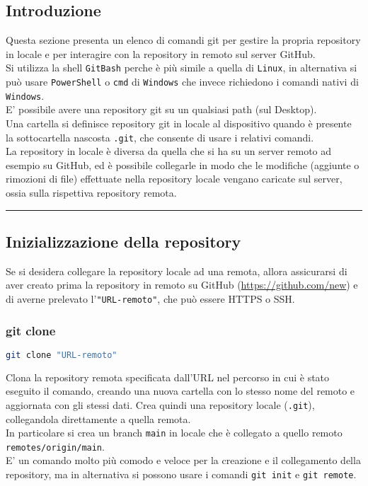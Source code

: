 \subsection*{Introduzione}
Questa sezione presenta un elenco di comandi git per gestire la propria repository in locale e per interagire con la repository in remoto sul server GitHub.\vspace{.3cm}\\
Si utilizza la shell \texttt{GitBash} perche è più simile a quella di \texttt{Linux}, in alternativa si può usare \texttt{PowerShell} o \texttt{cmd} di \texttt{Windows} che invece richiedono i comandi nativi di \texttt{Windows}.\vspace{.3cm}\\
E' possibile avere una repository git su un qualsiasi path (sul Desktop).\\
Una cartella si definisce repository git in locale al dispositivo quando è presente la sottocartella nascosta \texttt{.git}, che consente di usare i relativi comandi.\\
La repository in locale è diversa da quella che si ha su un server remoto ad esempio su GitHub, ed è possibile collegarle in modo che le modifiche (aggiunte o rimozioni di file) effettuate nella repository locale vengano caricate sul server, ossia sulla rispettiva repository remota.\\

\hrule
\subsection{Inizializzazione della repository}
Se si desidera collegare la repository locale ad una remota, allora assicurarsi di aver creato prima la repository in remoto su GitHub (\url{https://github.com/new}) e di averne prelevato l'\texttt{\color{blue!70!black}"URL-remoto"}, che può essere HTTPS o SSH.

\subsubsection{git clone}
\begin{lstlisting}[language=bash]
	git clone "URL-remoto"
\end{lstlisting}
Clona la repository remota specificata dall'URL nel percorso in cui è stato eseguito il comando, creando una nuova cartella con lo stesso nome del remoto e aggiornata con gli stessi dati.
Crea quindi una repository locale (\texttt{.git}), collegandola direttamente a quella remota.\\
In particolare si crea un branch \texttt{main} in locale che è collegato a quello remoto \texttt{remotes/origin/main}.\\
E' un comando molto più comodo e veloce per la creazione e il collegamento della repository, ma in alternativa si possono usare i comandi \texttt{git init} e \texttt{git remote}.


